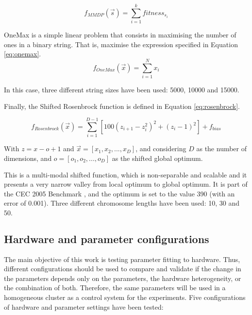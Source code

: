 \documentclass[final,1p,times]{elsarticle}
\begin{document}
\begin{equation}\label{eq:mmdp}
f_{MMDP}(\vec s)= \sum_{i=1}^{k} fitness_{s_i}
\end{equation}


OneMax is a simple linear problem that consists in maximising the number of ones in a binary string. That is, maximise the expression specified in Equation \ref{eq:onemax}.
\begin{equation}\label{eq:onemax}
f_{OneMax}(\vec{x}) = \sum_{i=1}^{N}{x_{i}}
\end{equation}

In this case, three different string sizes have been used: 5000, 10000 and 15000.

Finally, the Shifted Rosenbrock function is defined in Equation \ref{eq:rosenbrock}.


\begin{equation}\label{eq:rosenbrock}
f_{Rosenbrock}(\vec{x}) = \sum^{D-1}_{i = 1} [100(z_{i + 1} - z^2_i)^2 + (z_i - 1)^2] + f_{bias}
\end{equation}

With $z=x-o+1$ and $\vec{x}=[x_1,x_2,...,x_D]$, and considering $D$ as the number of dimensions, and $o=[o_1,o_2,...,o_D]$ as the shifted global optimum.

This is a multi-modal shifted function, which is non-separable and scalable and it presents a very narrow valley from local optimum to global optimum. It is part of the CEC 2005 Benchmark \cite{CEC2005_Benchmark}, and the optimum is set to the value 390 (with an error of 0.001). Three different chromosome lengths have been used: 10, 30 and 50.



\subsection{Hardware and parameter configurations}




The main objective of this work is testing parameter fitting to hardware. Thus, different configurations should be used to compare and validate if the change in the parameters depends only on the parameters, the hardware heterogeneity, or the combination of both. Therefore, the same parameters will be used in a homogeneous cluster as a control system for the experiments.
Five configurations of hardware and parameter settings have been tested:
\end{document}
